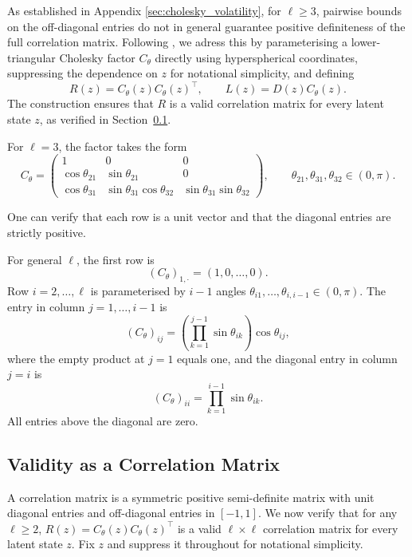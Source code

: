 As established in Appendix \ref{sec:cholesky_volatility}, for \(\ell\geq3\), pairwise bounds on the off-diagonal entries do not in general guarantee positive definiteness of the full correlation matrix. Following \citet{PourahmadiWang2015}, we adress this by parameterising a lower-triangular Cholesky factor $C_\theta$ directly using hyperspherical
coordinates, suppressing the dependence on \(z\) for notational simplicity, and defining
$$R(z)=C_\theta(z)C_\theta(z)^\top,\qquad L(z)=D(z)C_\theta(z).$$
The construction ensures that $R$ is a valid correlation matrix for every latent state $z$, as verified in 
Section~\ref{subsec:validity}.

For \(\ell=3\), the factor takes the form
\begin{equation}
C_\theta
=
\begin{pmatrix}
1 & 0 & 0 \\
\cos\theta_{21} & \sin\theta_{21} & 0 \\
\cos\theta_{31} &
\sin\theta_{31}\cos\theta_{32} &
\sin\theta_{31}\sin\theta_{32}
\end{pmatrix}, \qquad \theta_{21},\theta_{31},\theta_{32}\in(0,\pi). 
\label{eq:hypersphericalconstruction}
\end{equation}


One can verify that each row is a unit vector and that the diagonal entries are strictly positive.


For general $\ell$, the first row is 
$$(C_\theta)_{1,\cdot} = (1,0,\ldots,0).$$ 
Row $i = 2,\ldots,\ell$ is parameterised by $i-1$ angles $\theta_{i1},\ldots,\theta_{i,i-1}\in(0,\pi)$. The entry in column $j = 1,\ldots,i-1$ is
\[
(C_\theta)_{ij}
=
\left(\prod_{k=1}^{j-1}\sin\theta_{ik}\right)\cos\theta_{ij},
\]
where the empty product at $j=1$ equals one, and the diagonal entry in column $j=i$ is
\[
(C_\theta)_{ii}
=
\prod_{k=1}^{i-1}\sin\theta_{ik}.
\]
All entries above the diagonal are zero.




\subsection{Validity as a Correlation Matrix}
\label{subsec:validity}

A correlation matrix is a symmetric positive semi-definite matrix with unit diagonal entries and off-diagonal entries in $[-1,1]$. We now verify that for any $\ell\geq2$, $R(z)=C_\theta(z)C_\theta(z)^\top$ is a valid $\ell\times\ell$ correlation matrix for every latent state $z$. Fix $z$ and suppress it throughout for notational simplicity.

